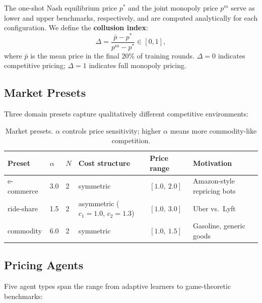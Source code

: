 \documentclass[11pt]{article}
\begin{document}
The one-shot Nash equilibrium price $p^*$ and the joint monopoly price $p^m$ serve as lower and upper benchmarks, respectively, and are computed analytically for each configuration.
We define the \textbf{collusion index}:
\begin{equation}
  \Delta = \frac{\bar{p} - p^*}{p^m - p^*} \in [0, 1],
\end{equation}
where $\bar{p}$ is the mean price in the final 20\% of training rounds.
$\Delta = 0$ indicates competitive pricing; $\Delta = 1$ indicates full monopoly pricing.

\subsection{Market Presets}

Three domain presets capture qualitatively different competitive environments:

\begin{table}[h]
\centering
\small
\caption{Market presets. $\alpha$ controls price sensitivity; higher $\alpha$ means more commodity-like competition.}
\label{tab:presets}
\begin{tabular}{llllll}
\toprule
\textbf{Preset} & \textbf{$\alpha$} & \textbf{$N$} & \textbf{Cost structure} & \textbf{Price range} & \textbf{Motivation} \\
\midrule
e-commerce & 3.0 & 2 & symmetric & $[1.0,\ 2.0]$ & Amazon-style repricing bots \\
ride-share & 1.5 & 2 & asymmetric ($c_1=1.0$, $c_2=1.3$) & $[1.0,\ 3.0]$ & Uber vs.\ Lyft \\
commodity   & 6.0 & 2 & symmetric & $[1.0,\ 1.5]$ & Gasoline, generic goods \\
\bottomrule
\end{tabular}
\end{table}

\subsection{Pricing Agents}

Five agent types span the range from adaptive learners to game-theoretic benchmarks:
\end{document}
